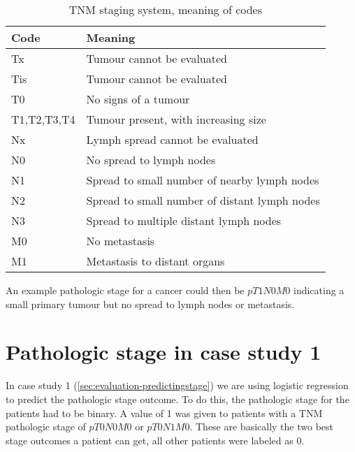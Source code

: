 \begin{table}
	\centering
	\begin{tabular}{ll}
		\toprule
		Code & Meaning \\
		\midrule
		Tx & Tumour cannot be evaluated \\
		Tis & Tumour cannot be evaluated \\
		T0 & No signs of a tumour \\
		T1,T2,T3,T4 & Tumour present, with increasing size \\
		\midrule
		Nx & Lymph spread cannot be evaluated \\
		N0 & No spread to lymph nodes \\
		N1 & Spread to small number of nearby lymph nodes \\
		N2 & Spread to small number of distant lymph nodes \\
		N3 & Spread to multiple distant lymph nodes \\
		\midrule
		M0 & No metastasis \\
		M1 & Metastasis to distant organs \\
		\bottomrule
	\end{tabular}
	\caption{TNM staging system, meaning of codes}
	\label{tab:TNM}
\end{table}
An example pathologic stage for a cancer could then be $pT1N0M0$ indicating a small primary tumour but no spread to lymph nodes or metastasis.
\section{Pathologic stage in case study 1}
In case study 1 (\ref{sec:evaluation-predictingstage}) we are using logistic regression to predict the pathologic stage outcome. To do this, the pathologic stage for the patients had to be binary. A value of 1 was given to patients with a TNM pathologic stage of $pT0N0M0$ or $pT0N1M0$. These are basically the two best stage outcomes a patient can get, all other patients were labeled as 0.


